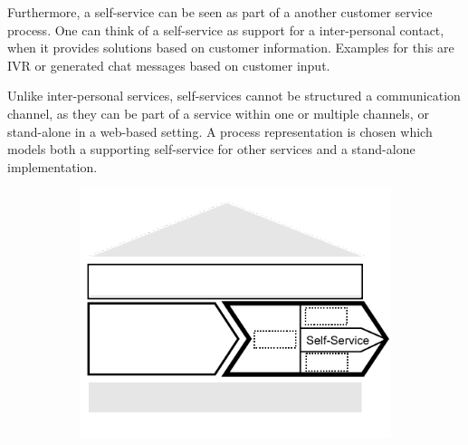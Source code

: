 	 Furthermore, a self-service can be seen as part of a another customer service process. One can think of a self-service as support for a inter-personal contact, when it provides solutions based on customer information. Examples for this are \acrshort{IVR} or generated chat messages based on customer input.
	 
	 Unlike inter-personal services, self-services cannot be structured \wrt a communication channel, as they can be part of a service within one or multiple channels, or stand-alone in a web-based setting. A process representation is chosen which models both a supporting self-service for other services and a stand-alone implementation.
	 
	 \begin{figure}[caption={Self-Service process}, label={fig:selfservice}]
	 	\begin{subfigure}[b]{.45\textwidth}
	 		\begin{center}
	 			\includegraphics{figures/processes/selfservice.pdf}
	 		\end{center}
	 	\end{subfigure}
	 	\begin{subfigure}[b]{.45\textwidth}
	 		\begin{center}
	 		\end{center}
	 	\end{subfigure}
	 	
	 \end{figure}
	 
